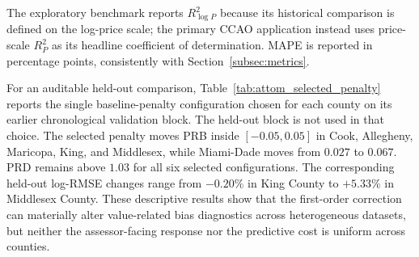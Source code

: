 \documentclass[10pt]{article}
\theoremstyle{definition}
\newcommand{\1}{\mathbf{1}}
\newcommand{\oldtext}[1]{\textcolor{blue}{\sout{#1}}}
\newcommand{\newtext}[1]{\textcolor{impGreen}{#1}}
\begin{document}
\newtext{The exploratory benchmark reports $R^2_{\log P}$ because its historical comparison is defined on the log-price scale; the primary CCAO application instead uses price-scale $R^2_P$ as its headline coefficient of determination. MAPE is reported in percentage points, consistently with Section~\ref{subsec:metrics}.}

\newtext{For an auditable held-out comparison, Table~\ref{tab:attom_selected_penalty} reports the single baseline-penalty configuration chosen for each county on its earlier chronological validation block. The held-out block is not used in that choice. The selected penalty moves PRB inside $[-0.05,0.05]$ in Cook, Allegheny, Maricopa, King, and Middlesex, while Miami-Dade moves from $0.027$ to $0.067$. PRD remains above $1.03$ for all six selected configurations. The corresponding held-out log-RMSE changes range from $-0.20\%$ in King County to $+5.33\%$ in Middlesex County. These descriptive results show that the first-order correction can materially alter value-related bias diagnostics across heterogeneous datasets, but neither the assessor-facing response nor the predictive cost is uniform across counties.}
\end{document}
